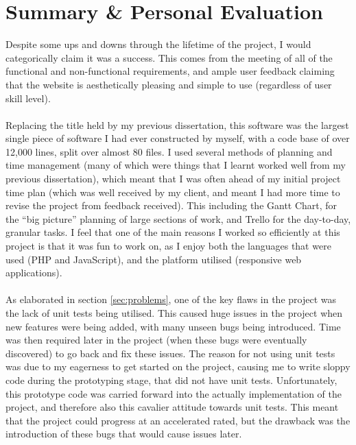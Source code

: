 \section{Summary \& Personal Evaluation}
Despite some ups and downs through the lifetime of the project, I would categorically claim it was a success. This comes from the meeting of all of the functional and non-functional requirements, and ample user feedback claiming that the website is aesthetically pleasing and simple to use (regardless of user skill level).
\ \\
\ \\
Replacing the title held by my previous dissertation, this software was the largest single piece of software I had ever constructed by myself, with a code base of over 12,000 lines, split over almost 80 files. I used several methods of planning and time management (many of which were things that I learnt worked well from my previous dissertation), which meant that I was often ahead of my initial project time plan (which was well received by my client, and meant I had more time to revise the project from feedback received). This including the Gantt Chart, for the ``big picture'' planning of large sections of work, and Trello for the day-to-day,  granular tasks. I feel that one of the main reasons I worked so efficiently at this project is that it was fun to work on, as I enjoy both the languages that were used (PHP and JavaScript), and the platform utilised (responsive web applications).\ \\
\ \\
As elaborated in section \ref{sec:problems}, one of the key flaws in the project was the lack of unit tests being utilised. This caused huge issues in the project when new features were being added, with many unseen bugs being introduced. Time was then required later in the project (when these bugs were eventually discovered) to go back and fix these issues. The reason for not using unit tests was due to my eagerness to get started on the project, causing me to write sloppy code during the prototyping stage, that did not have unit tests. Unfortunately, this prototype code was carried forward into the actually implementation of the project, and therefore also this cavalier attitude towards unit tests. This meant that the project could progress at an accelerated rated, but the drawback was the introduction of these bugs that would cause issues later.\ \\
\ \\
